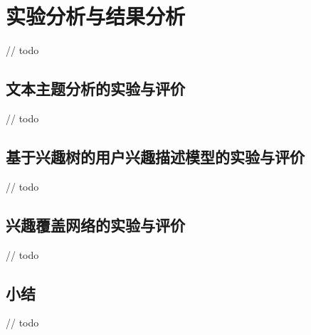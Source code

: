 \section{实验分析与结果分析}
// todo

\subsection{文本主题分析的实验与评价}
// todo

\subsection{基于兴趣树的用户兴趣描述模型的实验与评价}
// todo

\subsection{兴趣覆盖网络的实验与评价}
// todo

\subsection{小结}
// todo
